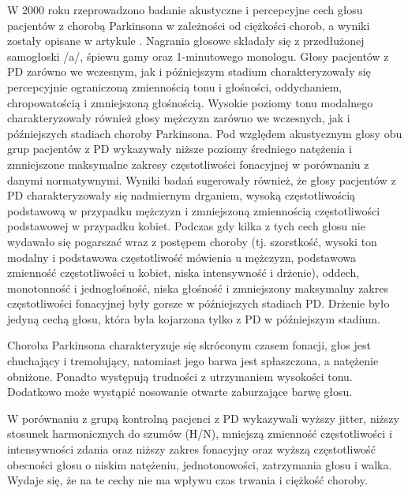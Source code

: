 W 2000 roku rzeprowadzono badanie akustyczne i percepcyjne cech głosu pacjentów z chorobą Parkinsona w zależności od
ciężkości chorob, a wyniki zostały opisane w artykule \cite{https://doi.org/10.1080/136828200410654}.
Nagrania głosowe składały się z przedłużonej samogłoski /a/, śpiewu gamy oraz 1-minutowego monologu.
Głosy pacjentów z PD zarówno we wczesnym, jak i późniejszym stadium charakteryzowały się percepcyjnie ograniczoną
zmiennością tonu i głośności, oddychaniem, chropowatością i zmniejszoną głośnością.
Wysokie poziomy tonu modalnego charakteryzowały również głosy mężczyzn zarówno we wczesnych, jak i późniejszych stadiach choroby Parkinsona.
Pod względem akustycznym głosy obu grup pacjentów z PD wykazywały niższe poziomy średniego natężenia i zmniejszone
maksymalne zakresy częstotliwości fonacyjnej w porównaniu z danymi normatywnymi.
Wyniki badań sugerowały również, że głosy pacjentów z PD charakteryzowały się nadmiernym drganiem, wysoką częstotliwością
podstawową w przypadku mężczyzn i zmniejszoną zmiennością częstotliwości podstawowej w przypadku kobiet.
Podczas gdy kilka z tych cech głosu nie wydawało się pogarszać wraz z postępem choroby (tj. szorstkość, wysoki ton modalny
i podstawowa częstotliwość mówienia u mężczyzn, podstawowa zmienność częstotliwości u kobiet, niska intensywność i drżenie),
oddech, monotonność i jednogłośność, niska głośność i zmniejszony maksymalny zakres częstotliwości fonacyjnej były gorsze w
późniejszych stadiach PD. Drżenie było jedyną cechą głosu, która była kojarzona tylko z PD w późniejszym stadium.


Choroba Parkinsona charakteryzuje się skróconym czasem fonacji, głos jest chuchający i tremolujący, natomiast jego barwa jest
spłaszczona, a natężenie obniżone.
Ponadto występują trudności z utrzymaniem wysokości tonu.
Dodatkowo może wystąpić nosowanie otwarte zaburzające barwę głosu\cite{Kuryłowicz_2019}.

W porównaniu z grupą kontrolną pacjenci z PD wykazywali wyższy jitter, niższy stosunek harmonicznych do szumów (H/N),
mniejszą zmienność częstotliwości i intensywności zdania oraz niższy zakres fonacyjny oraz wyższą częstotliwość obecności
głosu o niskim natężeniu, jednotonowości, zatrzymania głosu i walka.
Wydaje się, że na te cechy nie ma wpływu czas trwania i ciężkość choroby. \cite{GAMBOA1997314}